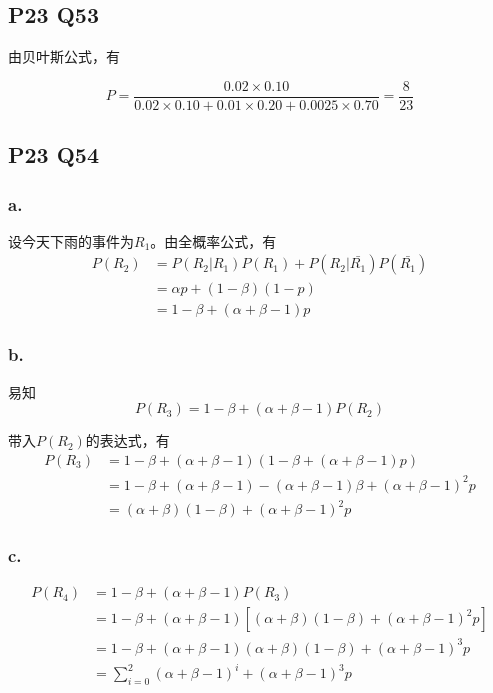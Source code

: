 \documentclass[a4paper,12pt]{ctexart}
\begin{document}
\subsection*{P23 Q53}
由贝叶斯公式，有

\begin{equation*}
	P = \frac{0.02 \times 0.10}{0.02 \times 0.10 + 0.01 \times 0.20 + 0.0025 \times 0.70} = \frac{8}{23}
\end{equation*}

\subsection*{P23 Q54}

\subsubsection*{a.}

设今天下雨的事件为$R_1$。由全概率公式，有
\begin{align*}
	P(R_2) &= P(R_2|R_1)P(R_1) + P(R_2|\bar{R_1})P(\bar{R_1})\\
	&= \alpha p + (1-\beta)(1-p)\\
	&= 1 - \beta + (\alpha + \beta - 1)p
\end{align*}

\subsubsection*{b.}
易知
\begin{equation*}
	P(R_3) = 1 - \beta + (\alpha + \beta - 1)P(R_2)
\end{equation*}

带入$P(R_2)$的表达式，有
\begin{align*}
	P(R_3) &= 1 - \beta + (\alpha + \beta - 1)(1 - \beta + (\alpha + \beta - 1)p)\\
	&= 1 - \beta + (\alpha + \beta - 1) - (\alpha + \beta - 1)\beta + (\alpha + \beta - 1)^2p\\
	&= (\alpha + \beta)(1 - \beta) + (\alpha + \beta - 1)^2 p
\end{align*}

\subsubsection*{c.}
\begin{align*}
	P(R_4) &= 1 - \beta + (\alpha + \beta - 1)P(R_3)\\
	&= 1 - \beta + (\alpha + \beta - 1)[(\alpha + \beta)(1 - \beta) + (\alpha + \beta - 1)^2 p]\\
	&= 1 - \beta + (\alpha + \beta - 1)(\alpha + \beta)(1 - \beta) + (\alpha + \beta - 1)^3 p\\
	&= \sum_{i=0}^{2}(\alpha + \beta - 1)^i + (\alpha + \beta - 1)^3 p
\end{align*}
\end{document}
